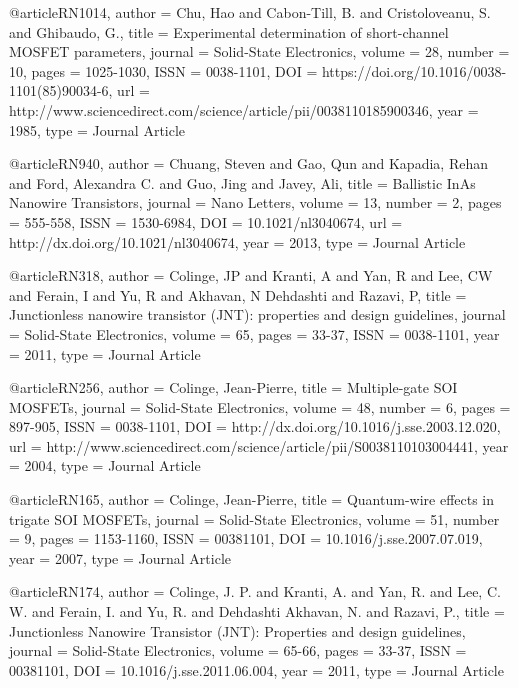 @article{RN1014,
   author = {Chu, Hao and Cabon-Till, B. and Cristoloveanu, S. and Ghibaudo, G.},
   title = {Experimental determination of short-channel MOSFET parameters},
   journal = {Solid-State Electronics},
   volume = {28},
   number = {10},
   pages = {1025-1030},
   ISSN = {0038-1101},
   DOI = {https://doi.org/10.1016/0038-1101(85)90034-6},
   url = {http://www.sciencedirect.com/science/article/pii/0038110185900346},
   year = {1985},
   type = {Journal Article}
}

@article{RN940,
   author = {Chuang, Steven and Gao, Qun and Kapadia, Rehan and Ford, Alexandra C. and Guo, Jing and Javey, Ali},
   title = {Ballistic InAs Nanowire Transistors},
   journal = {Nano Letters},
   volume = {13},
   number = {2},
   pages = {555-558},
   ISSN = {1530-6984},
   DOI = {10.1021/nl3040674},
   url = {http://dx.doi.org/10.1021/nl3040674},
   year = {2013},
   type = {Journal Article}
}

@article{RN318,
   author = {Colinge, JP and Kranti, A and Yan, R and Lee, CW and Ferain, I and Yu, R and Akhavan, N Dehdashti and Razavi, P},
   title = {Junctionless nanowire transistor (JNT): properties and design guidelines},
   journal = {Solid-State Electronics},
   volume = {65},
   pages = {33-37},
   ISSN = {0038-1101},
   year = {2011},
   type = {Journal Article}
}

@article{RN256,
   author = {Colinge, Jean-Pierre},
   title = {Multiple-gate SOI MOSFETs},
   journal = {Solid-State Electronics},
   volume = {48},
   number = {6},
   pages = {897-905},
   ISSN = {0038-1101},
   DOI = {http://dx.doi.org/10.1016/j.sse.2003.12.020},
   url = {http://www.sciencedirect.com/science/article/pii/S0038110103004441},
   year = {2004},
   type = {Journal Article}
}

@article{RN165,
   author = {Colinge, Jean-Pierre},
   title = {Quantum-wire effects in trigate SOI MOSFETs},
   journal = {Solid-State Electronics},
   volume = {51},
   number = {9},
   pages = {1153-1160},
   ISSN = {00381101},
   DOI = {10.1016/j.sse.2007.07.019},
   year = {2007},
   type = {Journal Article}
}

@article{RN174,
   author = {Colinge, J. P. and Kranti, A. and Yan, R. and Lee, C. W. and Ferain, I. and Yu, R. and Dehdashti Akhavan, N. and Razavi, P.},
   title = {Junctionless Nanowire Transistor (JNT): Properties and design guidelines},
   journal = {Solid-State Electronics},
   volume = {65-66},
   pages = {33-37},
   ISSN = {00381101},
   DOI = {10.1016/j.sse.2011.06.004},
   year = {2011},
   type = {Journal Article}
}

